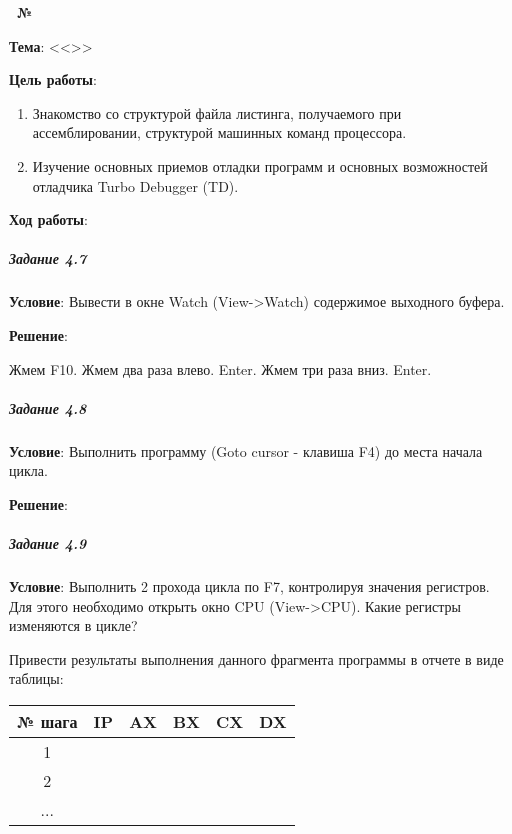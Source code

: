 \begin{center}
   \textbf{\titlePageWorkType~№\titlePageWorkNumber~\titlePageWorkPart}
\end{center}

\textbf{Тема}: <<\titlePageTopic>>

\textbf{Цель работы}: 

\begin{enumerate}
   \item Знакомство со структурой файла листинга, получаемого при ассемблировании, структурой машинных команд процессора.
   \item Изучение основных приемов отладки программ и основных возможностей отладчика Turbo Debugger (TD).
\end{enumerate}

\begin{center}
   \textbf{Ход работы}:
\end{center}










\subparagraph{Задание 4.7}

\textbf{Условие}:
Вывести в окне Watch (View->Watch) содержимое выходного буфера. 

\textbf{Решение}:

Жмем F10. Жмем два раза влево. Enter. Жмем три раза вниз. Enter. 


\subparagraph{Задание 4.8}

\textbf{Условие}:
Выполнить программу (Goto cursor - клавиша F4) до места начала цикла. 

\textbf{Решение}:



\subparagraph{Задание 4.9}

\textbf{Условие}:
Выполнить 2 прохода цикла по F7, контролируя значения регистров. Для этого необходимо открыть окно CPU (View->CPU). Какие регистры изменяются в цикле?

Привести результаты выполнения данного фрагмента программы в отчете в виде таблицы:

\begin{table}[!ht]
   \centering

   \begin{tabular}{|c|c|c|c|c|c|} 
      \hline
      № шага  & IP  & AX  & BX  & CX  & DX  \\ \hline
      \hline
      1       &     &     &     &     &     \\ \hline
      2       &     &     &     &     &     \\ \hline
      ...     &     &     &     &     &     \\ \hline
   \end{tabular}
\end{table}

